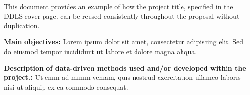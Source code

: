 \documentclass[11pt]{article}
\begin{document}


%

{\textbf{\Large\DDLSTitle}}\\[0.75em]


\noindent
This document provides an example of how the project title,
specified in the DDLS cover page, can be reused consistently
throughout the proposal without duplication.


{\bf Main objectives:}
Lorem ipsum dolor sit amet, consectetur adipiscing elit. Sed
do eiusmod tempor incididunt ut labore et dolore magna aliqua.

{\bf Description of data-driven methods used and/or developed within the project.:}
Ut enim ad minim veniam, quis nostrud exercitation ullamco
laboris nisi ut aliquip ex ea commodo consequat.
\end{document}
